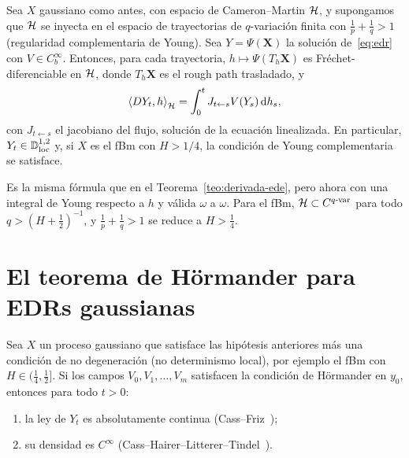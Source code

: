 \begin{teorema}
Sea $X$ gaussiano como antes, con espacio de Cameron--Martin $\mathcal{H}$, y
supongamos que $\mathcal{H}$ se inyecta en el espacio de trayectorias de $q$-variación finita con $\frac1p+\frac1q>1$
\textup{(}regularidad complementaria de Young\textup{)}. Sea $Y=\Psi(\mathbf X)$ la solución de~\eqref{eq:edr} con $V\in C_b^\infty$.
Entonces, para cada trayectoria, $h\mapsto\Psi(T_h\mathbf X)$ es Fréchet-diferenciable en $\mathcal{H}$, donde $T_h\mathbf X$ es
el rough path trasladado, y
\[
  \left\langle DY_t, h\right\rangle_{\mathcal{H}}=\int_0^tJ_{t\leftarrow s}V(Y_s)\,\mathrm{d} h_s,
\]
con $J_{t\leftarrow s}$ el jacobiano del flujo, solución de la ecuación linealizada. En particular, $Y_t\in\mathbb{D}^{1,2}_{\mathrm{loc}}$
y, si $X$ es el fBm con $H>1/4$, la condición de Young complementaria se satisface.
\end{teorema}

Es la misma fórmula que en el Teorema~\ref{teo:derivada-ede}, pero ahora con una integral de Young respecto
a $h$ y válida $\omega$ a $\omega$. Para el fBm, $\mathcal{H}\subset C^{q\text{-var}}$ para todo $q>(H+\frac12)^{-1}$, y $\frac1p+\frac1q>1$ se reduce a
$H>\frac14$.

\section{El teorema de Hörmander para EDRs gaussianas}

\begin{teorema}
Sea $X$ un proceso
gaussiano que satisface las hipótesis anteriores más una condición de no degeneración \textup{(}no
determinismo local\textup{)}, por ejemplo el fBm con $H\in(\frac14,\frac12]$. Si los campos $V_0,V_1,\dots,V_m$
satisfacen la condición de Hörmander en $y_0$, entonces para todo $t>0$:
\begin{enumerate}[label=(\roman*)]
  \item la ley de $Y_t$ es absolutamente continua (Cass--Friz~\cite{CassFriz10});
  \item su densidad es $C^\infty$ (Cass--Hairer--Litterer--Tindel~\cite{CassHairerLittererTindel15}).
\end{enumerate}
\end{teorema}

